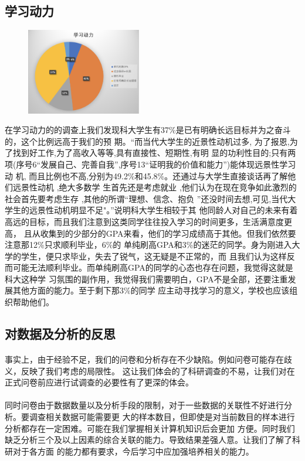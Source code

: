 \documentclass[UTF8]{ctexart}
\begin{document}
\subsection{学习动力}
\begin{figure}
\includegraphics[width=5cm]{chart/学习动力.png}
\end{figure}
在学习动力的的调查上我们发现科大学生有37\%是已有明确长远目标并为之奋斗的，这个比例远高于我们的预
期。“而当代大学生的近景性动机过多, 为了报恩,为了找到好工作,为了高收入等等,具有直接性、短期性,有明
显的功利性目的;只有两项(序号6“发展自己、完善自我”,序号13“证明我的价值和能力”)能体现远景性学习动
机, 而且比例也不高,分别为49.2\%和45.8\%。还通过与大学生直接谈话再了解他们远景性动机 ,绝大多数学
生首先还是考虑就业 ,他们认为在现在竞争如此激烈的社会首先要考虑生存 ,其他的所谓“理想、信念、抱负
”还没时间去想,可见,当代大学生的远景性动机明显不足"\cite{learninggoal}。”说明科大学生相较于其
他同龄人对自己的未来有着高远的目标，而且我们注意到这类同学往往投入学习的时间更多，生活满意度更高，
且从收集到的少部分的GPA来看，他们的学习成绩高于其他。但我们依然要注意那12\%只求顺利毕业，6\%的
单纯刷高GPA和3\%的迷茫的同学。身为刚进入大学的学生，便只求毕业，失去了锐气，这无疑是不正常的，而
且我们认为这样反而可能无法顺利毕业。而单纯刷高GPA的同学的心态也存在问题，我觉得这就是科大这种学
习氛围的副作用，我觉得我们需要明白，GPA不是全部，还要注重发展其他方面的能力。至于剩下那3\%的同学
应主动寻找学习的意义，学校也应该组织帮助他们。

\subsection{对数据及分析的反思}
\paragraph{}事实上，由于经验不足，我们的问卷和分析存在不少缺陷。例如问卷可能存在歧义，反映了我们考虑的局限性。
这让我们体会的了科研调查的不易，让我们对在正式问卷前应进行试调查的必要性有了更深的体会。
\paragraph{}
同时问卷由于数据数量以及分析手段的限制，对于一些数据的关联性不好进行分析。要调查相关数据可能需要更
大的样本数目，但即使是对当前数目的样本进行分析都存在一定困难。可能在我们掌握相关计算机知识后会更加
方便。同时我们缺乏分析三个及以上因素的综合关联的能力。导致结果差强人意。让我们了解了科研对于各方面
的能力都有要求，今后学习中应加强培养相关的能力。
\end{document}
